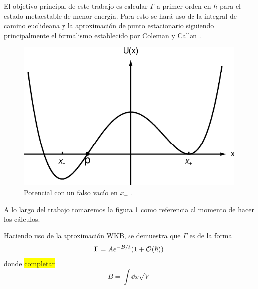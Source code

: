 El objetivo principal de este trabajo es calcular $\Gamma$ a primer orden en $\hbar$ para el estado metaestable de menor energía. Para esto se hará uso de la integral de camino euclideana y la aproximación de punto estacionario siguiendo principalmente el formalismo establecido por Coleman y Callan \cite{coleman1977fate, callan1977fate}. 

\begin{figure}[h!]
	\centering
	\includegraphics[scale = 0.4]{../FIGURAS/potencial}
	\caption{Potencial con un falso vacío en $x_+$ \cite{Ai:2019dqr}.}
	\label{fig:potencial}
\end{figure}

A lo largo del trabajo tomaremos la figura \ref{fig:potencial} como referencia al momento de hacer los cálculos. 

%	
%	
%	
%	
%	

Haciendo uso de la aproximación WKB, se demuestra que $\Gamma$ es de la forma \cite{coleman1977fate}
\begin{equation} \label{eq:gamma_WKB}
	\Gamma = Ae^{-B/\hbar}\qty(1 + \order{\hbar})
\end{equation}
donde 
\colorbox{yellow}{completar}
\begin{equation} \label{eq:B_WKB}
	B = \int \dd{x} \sqrt{V} 
\end{equation}





